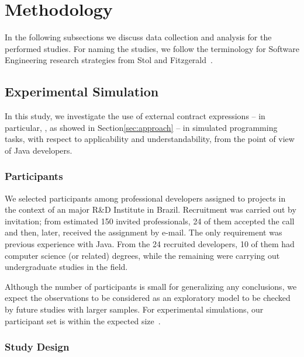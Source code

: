 \section{Methodology}
\label{sec:researchDesign}

In the following subsections we discuss data collection and analysis for the performed studies. For naming the studies, we follow the terminology for Software Engineering research strategies from Stol and Fitzgerald~\cite{Stol2015}.

\subsection{Experimental Simulation}
\label{sec:experiment}

In this study, we investigate the use of
external contract expressions -- in particular, \contractjdoc{}, as showed in Section\ref{sec:approach} -- in simulated programming tasks, with respect to applicability and understandability, from the point of view of Java developers. 

\subsubsection{Participants}
\label{sec:expPart}

We selected participants among professional developers assigned to projects in the context of an major R\&D Institute in Brazil. Recruitment was carried out by invitation; from estimated 150 invited professionals, 24 of them accepted the call and then, later, received the assignment by e-mail. The only requirement was previous experience with Java. From the 24 recruited developers, 10 of them had computer science (or related) degrees, while the remaining were carrying out undergraduate studies in the field. 

Although the number of participants is small for generalizing any conclusions, we expect the observations to be considered as an exploratory model to be checked by future studies with larger samples. For experimental simulations, our participant set is within the expected size~\cite{Stol2015}.


\subsubsection{Study Design}
\label{sec:studyDesign}

